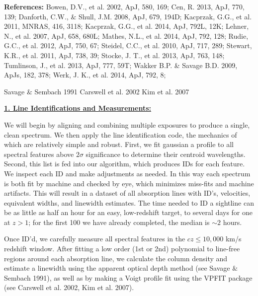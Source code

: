 \documentclass[12pt]{article}
\begin{document}
\noindent \textbf{References: } Bowen, D.V., et al. 2002, ApJ, 580, 169; Cen, R. 2013, ApJ, 770, 139; Danforth, C.W., $\&$ Shull, J.M. 2008, ApJ, 679, 194D; Kacprzak, G.G., et al. 2011, MNRAS, 416, 3118; Kacprzak, G.G., et al. 2014, ApJ, 792L, 12K; Lehner, N., et al. 2007, ApJ, 658, 680L; Mathes, N.L., et al. 2014, ApJ, 792, 128; Rudie, G.C., et al. 2012, ApJ,  750, 67; Steidel, C.C., et al. 2010, ApJ, 717, 289; Stewart, K.R., et al. 2011, ApJ, 738, 39; Stocke, J. T., et al. 2013, ApJ, 763, 148; Tumlinson, J., et al. 2013, ApJ, 777, 59T; Wakker B.P. \& Savage B.D. 2009, ApJs, 182, 378; Werk, J. K., et al. 2014, ApJ, 792, 8; 

Savage $\&$ Sembach 1991
Carswell et al. 2002
Kim et al. 2007

%
%
\describearchival       %

\noindent \textbf{\underline{1. Line Identifications and Measurements:}}

We will begin by aligning and combining multiple exposures to produce a single, clean spectrum. We then apply the line identification code, the mechanics of which are relatively simple and robust. First, we fit gaussian a profile to all spectral features above $2\sigma$ significance to determine their centroid wavelengths. Second, this list is fed into our algorithm, which produces IDs for each feature. We inspect each ID and make adjustments as needed. In this way each spectrum is both fit by machine and checked by eye, which minimizes miss-fits and machine artifacts. This will result in a dataset of all absorption lines with ID's, velocities, equivalent widths, and linewidth estimates. The time needed to ID a sightline can be as little as half an hour for an easy, low-redshift target, to several days for one at $z>1$; for the first 100 we have already completed, the median is $\sim 2$ hours.

Once ID'd, we carefully measure all spectral features in the $cz\le 10,000$ km/s redshift window. After fitting a low order (1st or 2nd) polynomial to line-free regions around each absorption line, we calculate the column density and estimate a linewidth using the apparent optical depth method (see Savage $\&$ Sembach 1991), as well as by making a Voigt profile fit using the VPFIT package (see Carswell et al. 2002, Kim et al. 2007).\\
\end{document}
